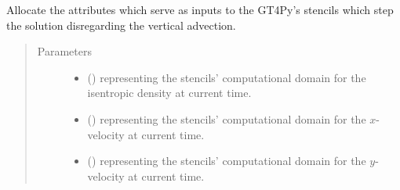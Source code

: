 \documentclass[letterpaper,10pt,english]{sphinxmanual}
\begin{document}
\begin{fulllineitems}
\begin{fulllineitems}
\label{\detokenize{api:dycore.prognostic_isentropic.PrognosticIsentropic._stencils_stepping_by_neglecting_vertical_advection_allocate_inputs}}
Allocate the attributes which serve as inputs to the GT4Py’s stencils which step the solution
disregarding the vertical advection.
\begin{quote}\begin{description}
\item[{Parameters}] \leavevmode\begin{itemize}
\item {} 
 () \textendash{}  representing the stencils’ computational domain for the isentropic density at current time.

\item {} 
 () \textendash{}  representing the stencils’ computational domain for the \(x\)-velocity at current time.

\item {} 
 () \textendash{}  representing the stencils’ computational domain for the \(y\)-velocity at current time.

\end{itemize}

\end{description}\end{quote}

\end{fulllineitems}



\end{fulllineitems}
\end{document}
